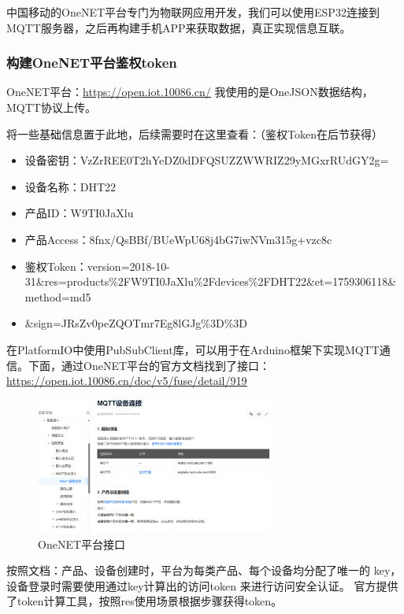 中国移动的OneNET平台专门为物联网应用开发，我们可以使用ESP32连接到MQTT服务器，之后再构建手机APP来获取数据，真正实现信息互联。

\subsubsection{构建OneNET平台鉴权token}
OneNET平台：\href{https://open.iot.10086.cn/}{\underline{https://open.iot.10086.cn/}}
我使用的是OneJSON数据结构，MQTT协议上传。

将一些基础信息置于此地，后续需要时在这里查看：（鉴权Token在后节获得）
\begin{itemize}
    \item 设备密钥：VzZrREE0T2hYeDZ0dDFQSUZZWWRIZ29yMGxrRUdGY2g=
    \item 设备名称：DHT22
    \item 产品ID：W9TI0JaXlu
    \item 产品Access：8fnx/QsBBf/BUeWpU68j4bG7iwNVm315g+vzc8c
    \item 鉴权Token：version=2018-10-31\&res=products\%2FW9TI0JaXlu\%2Fdevices\%2FDHT22\&et=1759306118\&method=md5
    \item \&sign=JRsZv0peZQOTmr7Eg8lGJg\%3D\%3D
\end{itemize}

在PlatformIO中使用PubSubClient库，可以用于在Arduino框架下实现MQTT通信。下面，通过OneNET平台的官方文档找到了接口：\href{https://open.iot.10086.cn/doc/v5/fuse/detail/919}{\underline{https://open.iot.10086.cn/doc/v5/fuse/detail/919}}

\begin{figure} [H]
    \centering
    \includegraphics[width=0.7\textwidth]{img/MQTTInit.png}
    \caption{OneNET平台接口}
\end{figure}

按照文档：产品、设备创建时，平台为每类产品、每个设备均分配了唯一的 key，设备登录时需要使用通过key计算出的访问token 来进行访问安全认证。
官方提供了token计算工具，按照res使用场景根据步骤获得token。

